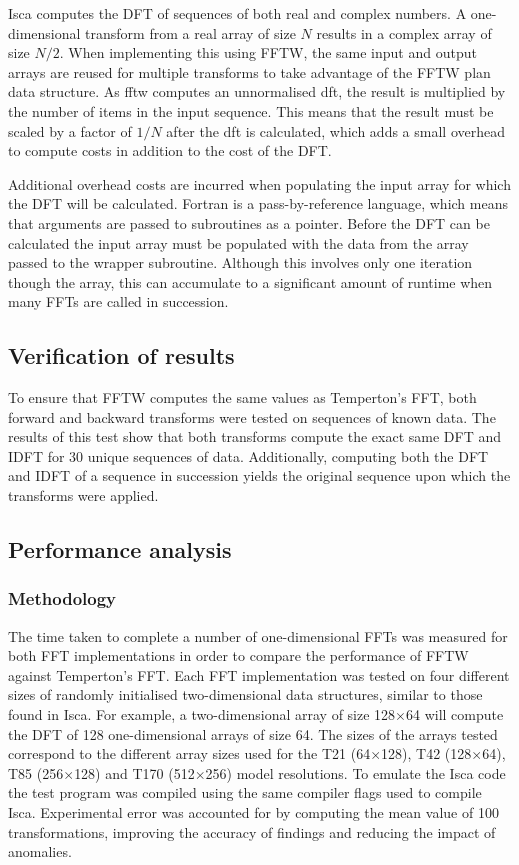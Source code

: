 \documentclass[a4paper,11pt]{report}
\begin{document}
\par
Isca computes the DFT of sequences of both real and complex numbers. A one-dimensional transform from a real array of size $N$ results in a complex array of size $N/2$. When implementing this using FFTW, the same input and output arrays are reused for multiple transforms to take advantage of the FFTW plan data structure. As \gls{fftw} computes an unnormalised \gls{dft}, the result is multiplied by the number of items in the input sequence. This means that the result must be scaled by a factor of $1/N$ after the \gls{dft} is calculated, which adds a small overhead to compute costs in addition to the cost of the DFT.  
\par
Additional overhead costs are incurred when populating the input array for which the DFT will be calculated. Fortran is a pass-by-reference language, which means that arguments are passed to subroutines as a pointer. Before the DFT can be calculated the input array must be populated with the data from the array passed to the wrapper subroutine. Although this involves only one iteration though the array, this can accumulate to a significant amount of runtime when many FFTs are called in succession.

\subsection{Verification of results}
To ensure that FFTW computes the same values as Temperton's FFT, both forward and backward transforms were tested on sequences of known data. The results of this test show that both transforms compute the exact same DFT and IDFT for 30 unique sequences of data. Additionally, computing both the DFT and IDFT of a sequence in succession yields the original sequence upon which the transforms were applied.

\subsection{Performance analysis}

\subsubsection{Methodology}

The time taken to complete a number of one-dimensional FFTs was measured for both FFT implementations in order to compare the performance of FFTW against Temperton's FFT. Each FFT implementation was tested on four different sizes of randomly initialised two-dimensional data structures, similar to those found in Isca. For example, a two-dimensional array of size 128$\times$64 will compute the DFT of 128 one-dimensional arrays of size 64. The sizes of the arrays tested correspond to the different array sizes used for the T21 (64$\times$128), T42 (128$\times$64), T85 (256$\times$128) and T170 (512$\times$256) model resolutions. To emulate the Isca code the test program was compiled using the same compiler flags used to compile Isca. Experimental error was accounted for by computing the mean value of 100 transformations, improving the accuracy of findings and reducing the impact of anomalies.
\end{document}
